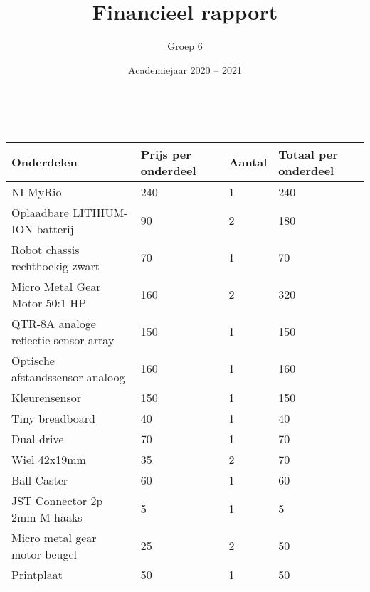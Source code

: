 \documentclass[a4paper,kulak]{kulakarticle} %
\date{Academiejaar 2020 -- 2021}
\title{Financieel rapport}
\author{Groep 6}
\begin{document}

\maketitle



~

	\begin{tabular}{|l|l|l|l|}
		\hline
		\textbf{Onderdelen}                   & \textbf{Prijs per onderdeel} & \textbf{Aantal} & \textbf{Totaal per onderdeel} \\ \hline
		NI MyRio                              & 240                          & 1               & 240                           \\ \hline
		Oplaadbare LITHIUM-ION batterij       & 90                           & 2               & 180                           \\ \hline
		Robot chassis rechthoekig zwart       & 70                           & 1               & 70                            \\ \hline
		Micro Metal Gear Motor 50:1 HP        & 160                          & 2               & 320                           \\ \hline
		QTR-8A analoge reflectie sensor array & 150                          & 1               & 150                           \\ \hline
		Optische afstandssensor analoog       & 160                          & 1               & 160                           \\ \hline
		Kleurensensor                         & 150                          & 1               & 150                           \\ \hline
		Tiny breadboard                       & 40                           & 1               & 40                            \\ \hline
		Dual drive                            & 70                           & 1               & 70                            \\ \hline
		Wiel 42x19mm                          & 35                           & 2               & 70                            \\ \hline
		Ball Caster                           & 60                           & 1               & 60                            \\ \hline
		JST Connector 2p 2mm M haaks          & 5                            & 1               & 5                             \\ \hline
		Micro metal gear motor beugel         & 25                           & 2               & 50                            \\ \hline
		Printplaat                            & 50                           & 1               & 50                            \\ \hline
	\end{tabular}
\end{document}
